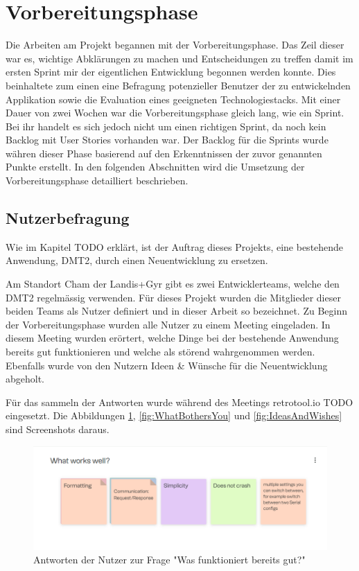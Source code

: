 \section{Vorbereitungsphase}
Die Arbeiten am Projekt begannen mit der Vorbereitungsphase. Das Zeil dieser war es, wichtige Abklärungen zu machen und Entscheidungen zu treffen damit im ersten Sprint mir der eigentlichen Entwicklung begonnen werden konnte.
Dies beinhaltete zum einen eine Befragung potenzieller Benutzer der zu entwickelnden Applikation sowie die Evaluation eines geeigneten Technologiestacks.
Mit einer Dauer von zwei Wochen war die Vorbereitungsphase gleich lang, wie ein Sprint. Bei ihr handelt es sich jedoch nicht um einen richtigen Sprint, da noch kein Backlog mit User Stories vorhanden war.
Der Backlog für die Sprints wurde währen dieser Phase basierend auf den Erkenntnissen der zuvor genannten Punkte erstellt.
In den folgenden Abschnitten wird die Umsetzung der Vorbereitungsphase detailliert beschrieben.

\subsection{Nutzerbefragung}
Wie im Kapitel TODO erklärt, ist der Auftrag dieses Projekts, eine bestehende Anwendung, DMT2, durch einen Neuentwicklung zu ersetzen.

Am Standort Cham der Landis+Gyr gibt es zwei Entwicklerteams, welche den DMT2 regelmässig verwenden.
Für dieses Projekt wurden die Mitglieder dieser beiden Teams als Nutzer definiert und in dieser Arbeit so bezeichnet.  %
Zu Beginn der Vorbereitungsphase wurden alle Nutzer zu einem Meeting eingeladen.
In diesem Meeting wurden erörtert, welche Dinge bei der bestehende Anwendung bereits gut funktionieren und welche als störend wahrgenommen werden.
Ebenfalls wurde von den Nutzern Ideen \& Wünsche für die Neuentwicklung abgeholt.

Für das sammeln der Antworten wurde während des Meetings retrotool.io TODO eingesetzt.
Die Abbildungen \ref{fig:WhatWorksWell}, \ref{fig:WhatBothersYou} und \ref{fig:IdeasAndWishes} sind Screenshots daraus.



\begin{figure}[H]
   \centering
   \includegraphics[width=1.0\textwidth]{gfx/S1_RetroBoard_WhatWorksWell.png}
   \caption{
       Antworten der Nutzer zur Frage "Was funktioniert bereits gut?"
   }
   \label{fig:WhatWorksWell}
\end{figure}

